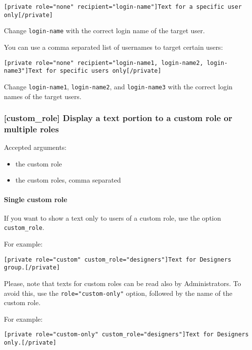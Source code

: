 \documentclass[a4paper,10pt]{article}
\begin{document}
\begin{lstlisting}
[private role="none" recipient="login-name"]Text for a specific user only[/private]
\end{lstlisting}

Change \verb+login-name+ with the correct login name of the target user.

You can use a comma separated list of usernames to target certain users:

\begin{lstlisting}
[private role="none" recipient="login-name1, login-name2, login-name3"]Text for specific users only[/private]
\end{lstlisting}

Change \verb+login-name1+, \verb+login-name2+, and \verb+login-name3+ with the correct login names of the target users.

\subsubsection{[custom\_role] Display a text portion to a custom role or multiple roles}

Accepted arguments:

\begin{itemize}
 \item the custom role
 \item the custom roles, comma separated
\end{itemize}

\paragraph{Single custom role}

If you want to show a text only to users of a custom role, use the option \verb+custom_role+.

For example:

\begin{lstlisting}
[private role="custom" custom_role="designers"]Text for Designers group.[/private]
\end{lstlisting}


Please, note that texts for custom roles can be read also by Administrators. To avoid this, use the \verb+role="custom-only"+ option, followed by the name of the custom role.

For example:

\begin{lstlisting}
[private role="custom-only" custom_role="designers"]Text for Designers only.[/private]
\end{lstlisting}
\end{document}
